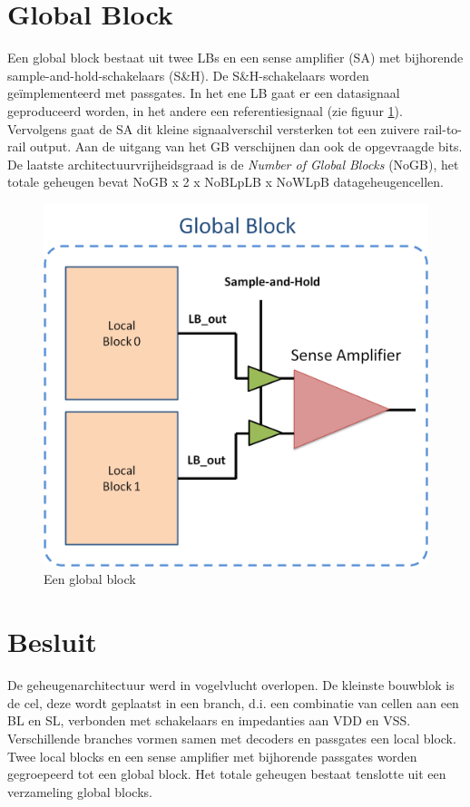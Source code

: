 \section{Global Block}
\label{globalblock}
Een global block bestaat uit twee LBs en een sense amplifier (SA) met bijhorende sample-and-hold-schakelaars (S\&H). De S\&H-schakelaars worden geïmplementeerd met passgates. In het ene LB gaat er een datasignaal geproduceerd worden, in het andere een referentiesignaal (zie figuur \ref{fig:GB}). Vervolgens gaat de SA dit kleine signaalverschil versterken tot een zuivere rail-to-rail output.
Aan de uitgang van het GB verschijnen dan ook de opgevraagde bits.
De laatste architectuurvrijheidsgraad is de \emph{Number of Global Blocks} (NoGB), het totale geheugen bevat NoGB x 2 x NoBLpLB x NoWLpB datageheugencellen.

\begin{figure}
  \centering
  \includegraphics[scale=0.3]{../fig/hfdstk-architecture-globalblock.png}
  \caption[Een global block]{Een global block}
  \label{fig:GB}
\end{figure}

\section{Besluit}
De geheugenarchitectuur werd in vogelvlucht overlopen. De kleinste bouwblok is de cel, deze wordt geplaatst in een branch, d.i. een combinatie van cellen aan een BL en SL, verbonden met schakelaars en impedanties aan VDD en VSS. Verschillende branches vormen samen met decoders en passgates een local block. Twee local blocks en een sense amplifier met bijhorende passgates worden gegroepeerd tot een global block. Het totale geheugen bestaat tenslotte uit een verzameling global blocks.

